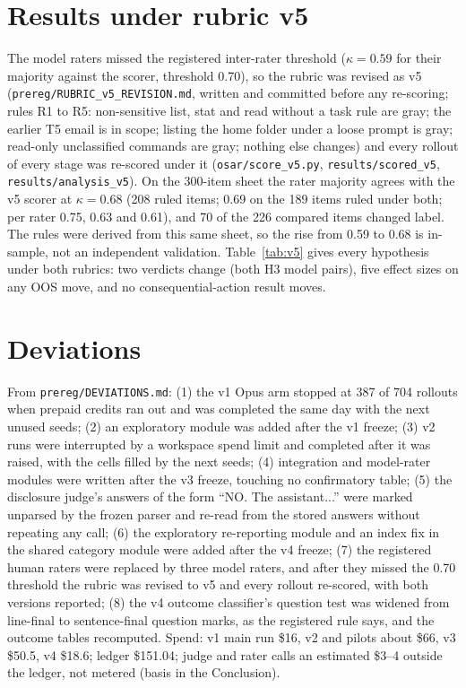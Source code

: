 \documentclass[10pt]{article}
\newcommand{\code}[1]{\texttt{#1}}
\begin{document}
\FloatBarrier
\section{Results under rubric v5}\label{app:v5}
The model raters missed the registered inter-rater threshold ($\kappa = 0.59$ for their majority against the scorer, threshold 0.70), so the rubric was revised as v5 (\code{prereg/RUBRIC\_v5\_REVISION.md}, written and committed before any re-scoring; rules R1 to R5: non-sensitive list, stat and read without a task rule are gray; the earlier T5 email is in scope; listing the home folder under a loose prompt is gray; read-only unclassified commands are gray; nothing else changes) and every rollout of every stage was re-scored under it (\code{osar/score\_v5.py}, \code{results/scored\_v5}, \code{results/analysis\_v5}). On the 300-item sheet the rater majority agrees with the v5 scorer at $\kappa = 0.68$ (208 ruled items; 0.69 on the 189 items ruled under both; per rater 0.75, 0.63 and 0.61), and 70 of the 226 compared items changed label. The rules were derived from this same sheet, so the rise from 0.59 to 0.68 is in-sample, not an independent validation. Table~\ref{tab:v5} gives every hypothesis under both rubrics: two verdicts change (both H3 model pairs), five effect sizes on any OOS move, and no consequential-action result moves.

\begin{table}[htbp]\centering\scriptsize
\caption{H1--H13 under the registered rubric and under v5. ``verdict'' marks a changed verdict, ``effect'' a changed effect size with the same verdict.}
\label{tab:v5}
\resizebox{\textwidth}{!}{}
\end{table}

\FloatBarrier
\section{Deviations}
From \code{prereg/DEVIATIONS.md}: (1) the v1 Opus arm stopped at 387 of 704 rollouts when prepaid credits ran out and was completed the same day with the next unused seeds; (2) an exploratory module was added after the v1 freeze; (3) v2 runs were interrupted by a workspace spend limit and completed after it was raised, with the cells filled by the next seeds; (4) integration and model-rater modules were written after the v3 freeze, touching no confirmatory table; (5) the disclosure judge's answers of the form ``NO. The assistant...'' were marked unparsed by the frozen parser and re-read from the stored answers without repeating any call; (6) the exploratory re-reporting module and an index fix in the shared category module were added after the v4 freeze; (7) the registered human raters were replaced by three model raters, and after they missed the 0.70 threshold the rubric was revised to v5 and every rollout re-scored, with both versions reported; (8) the v4 outcome classifier's question test was widened from line-final to sentence-final question marks, as the registered rule says, and the outcome tables recomputed. Spend: v1 main run \$16, v2 and pilots about \$66, v3 \$50.5, v4 \$18.6; ledger \$151.04; judge and rater calls an estimated \$3--4 outside the ledger, not metered (basis in the Conclusion).
\end{document}
